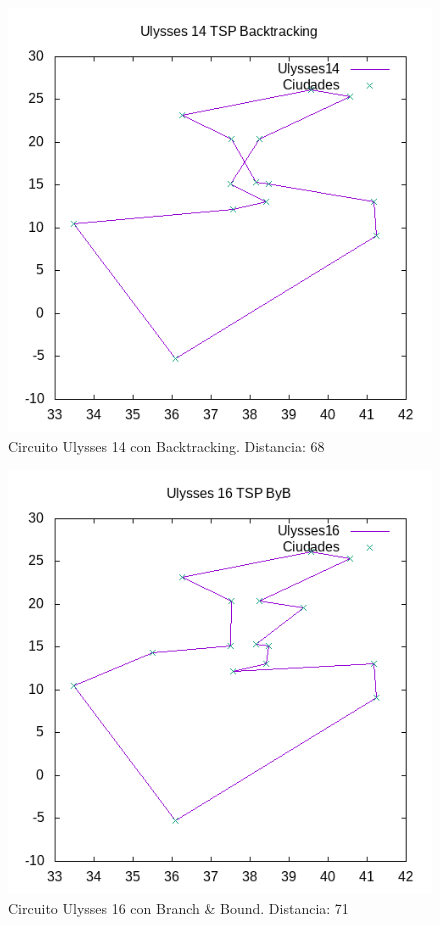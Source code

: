 \documentclass{article}
\begin{document}
	\begin{figure}[H]
		\centering
		\includegraphics[totalheight=6cm]{ulysses14back}
		\caption{Circuito Ulysses 14 con Backtracking. Distancia: 68}
		\label{fig:u14back}
	\end{figure}

	\begin{figure}[H]
		\centering
		\includegraphics[totalheight=6cm]{ulysses16byb}
		\caption{Circuito Ulysses 16 con Branch \& Bound. Distancia: 71}
		\label{fig:u16byb}
	\end{figure}
\end{document}
